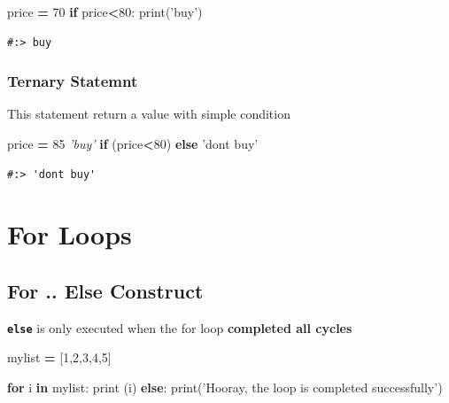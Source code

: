 \documentclass[
]{book}
\newenvironment{Shaded}{\begin{snugshade}}{\end{snugshade}}
\newcommand{\BuiltInTok}[1]{#1}
\newcommand{\CommentTok}[1]{\textcolor[rgb]{0.37,0.37,0.37}{\textit{#1}}}
\newcommand{\ControlFlowTok}[1]{\textcolor[rgb]{0.27,0.27,0.27}{\textbf{#1}}}
\newcommand{\DecValTok}[1]{\textcolor[rgb]{0.06,0.06,0.06}{#1}}
\newcommand{\KeywordTok}[1]{\textcolor[rgb]{0.27,0.27,0.27}{\textbf{#1}}}
\newcommand{\NormalTok}[1]{#1}
\newcommand{\OperatorTok}[1]{\textcolor[rgb]{0.43,0.43,0.43}{\textbf{#1}}}
\newcommand{\StringTok}[1]{\textcolor[rgb]{0.5,0.5,0.5}{#1}}
\begin{document}
\begin{Shaded}
\begin{Highlighting}[]
\NormalTok{price }\OperatorTok{=} \DecValTok{70}
\ControlFlowTok{if}\NormalTok{ price}\OperatorTok{<}\DecValTok{80}\NormalTok{: }\BuiltInTok{print}\NormalTok{(}\StringTok{'buy'}\NormalTok{)}
\end{Highlighting}
\end{Shaded}

\begin{verbatim}
#:> buy
\end{verbatim}

\hypertarget{ternary-statemnt}{%
\subsubsection{Ternary Statemnt}\label{ternary-statemnt}}

This statement return a value with simple condition

\begin{Shaded}
\begin{Highlighting}[]
\NormalTok{price }\OperatorTok{=} \DecValTok{85}
\CommentTok{'buy'} \ControlFlowTok{if}\NormalTok{ (price}\OperatorTok{<}\DecValTok{80}\NormalTok{) }\ControlFlowTok{else} \StringTok{'dont buy'}
\end{Highlighting}
\end{Shaded}

\begin{verbatim}
#:> 'dont buy'
\end{verbatim}

\hypertarget{for-loops}{%
\section{For Loops}\label{for-loops}}

\hypertarget{for-..-else-construct}{%
\subsection{For .. Else Construct}\label{for-..-else-construct}}

\textbf{\texttt{else}} is only executed when the for loop \textbf{completed all cycles}

\begin{Shaded}
\begin{Highlighting}[]

\NormalTok{mylist }\OperatorTok{=}\NormalTok{ [}\DecValTok{1}\NormalTok{,}\DecValTok{2}\NormalTok{,}\DecValTok{3}\NormalTok{,}\DecValTok{4}\NormalTok{,}\DecValTok{5}\NormalTok{]}

\ControlFlowTok{for}\NormalTok{ i }\KeywordTok{in}\NormalTok{ mylist:}
  \BuiltInTok{print}\NormalTok{ (i)}
\ControlFlowTok{else}\NormalTok{:}
  \BuiltInTok{print}\NormalTok{(}\StringTok{'Hooray, the loop is completed successfully'}\NormalTok{)}
\end{Highlighting}
\end{Shaded}
\end{document}
